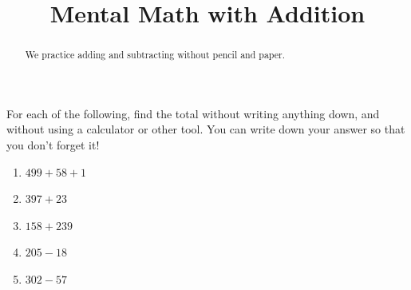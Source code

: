 \documentclass[nooutcomes,noauthor,handout]{ximera}
\title{Mental Math with Addition}
\begin{document}
\begin{abstract} We practice adding and subtracting without pencil and paper. \end{abstract}
\maketitle


\begin{problem}
For each of the following, find the total without writing anything down, and without using a calculator or other tool. You can write down your answer so that you don't forget it!

\begin{enumerate}
\item $499 + 58 + 1$
\item $397 + 23$
\item $158 + 239$
\item $205 - 18$
\item $302 - 57$
\end{enumerate}

\end{problem}
\end{document}
